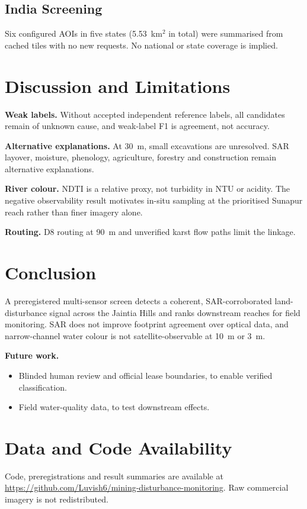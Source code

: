 \documentclass[conference]{IEEEtran}
\begin{document}
\subsection{India Screening}
Six configured AOIs in five states (5.53~km$^2$ in total) were summarised from cached tiles with no new requests. No national or state coverage is implied.

\section{Discussion and Limitations}
\textbf{Weak labels.} Without accepted independent reference labels, all candidates remain of unknown cause, and weak-label F1 is agreement, not accuracy.

\textbf{Alternative explanations.} At 30~m, small excavations are unresolved. SAR layover, moisture, phenology, agriculture, forestry and construction remain alternative explanations.

\textbf{River colour.} NDTI is a relative proxy, not turbidity in NTU or acidity. The negative observability result motivates in-situ sampling at the prioritised Sunapur reach rather than finer imagery alone.

\textbf{Routing.} D8 routing at 90~m and unverified karst flow paths limit the linkage.

\section{Conclusion}
A preregistered multi-sensor screen detects a coherent, SAR-corroborated land-disturbance signal across the Jaintia Hills and ranks downstream reaches for field monitoring. SAR does not improve footprint agreement over optical data, and narrow-channel water colour is not satellite-observable at 10~m or 3~m.

\textbf{Future work.}
\begin{itemize}
\item Blinded human review and official lease boundaries, to enable verified classification.
\item Field water-quality data, to test downstream effects.
\end{itemize}

\section*{Data and Code Availability}
Code, preregistrations and result summaries are available at \url{https://github.com/Luvish6/mining-disturbance-monitoring}. Raw commercial imagery is not redistributed.
\end{document}
